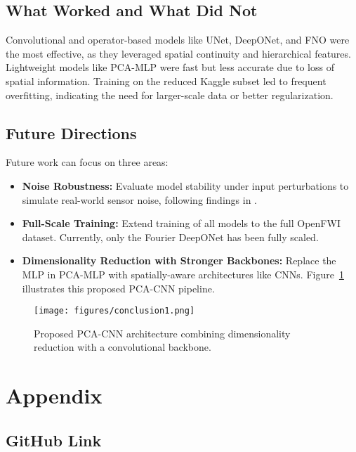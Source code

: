 \documentclass{article}
\newcommand{\instructions}[1]{{\color{blue} #1}}
\begin{document}
\subsection{What Worked and What Did Not}

Convolutional and operator-based models like UNet, DeepONet, and FNO were the most effective, as they leveraged spatial continuity and hierarchical features. Lightweight models like PCA-MLP were fast but less accurate due to loss of spatial information. Training on the reduced Kaggle subset led to frequent overfitting, indicating the need for larger-scale data or better regularization.

\subsection{Future Directions}

Future work can focus on three areas:
\begin{itemize}[leftmargin=*, itemsep=1pt, topsep=2pt]
    \item \textbf{Noise Robustness:} Evaluate model stability under input perturbations to simulate real-world sensor noise, following findings in \cite{fdonet}.
    \item \textbf{Full-Scale Training:} Extend training of all models to the full OpenFWI dataset. Currently, only the Fourier DeepONet has been fully scaled.
    \item \textbf{Dimensionality Reduction with Stronger Backbones:} Replace the MLP in PCA-MLP with spatially-aware architectures like CNNs. Figure~\ref{fig:conclusion1} illustrates this proposed PCA-CNN pipeline.
\end{itemize}

\begin{figure}[H]
    \centering
    \texttt{[image: figures/conclusion1.png]}
    \caption{Proposed PCA-CNN architecture combining dimensionality reduction with a convolutional backbone.}
    \label{fig:conclusion1}
\end{figure}

\newpage
\section*{Appendix}
\subsection*{GitHub Link}
\end{document}
